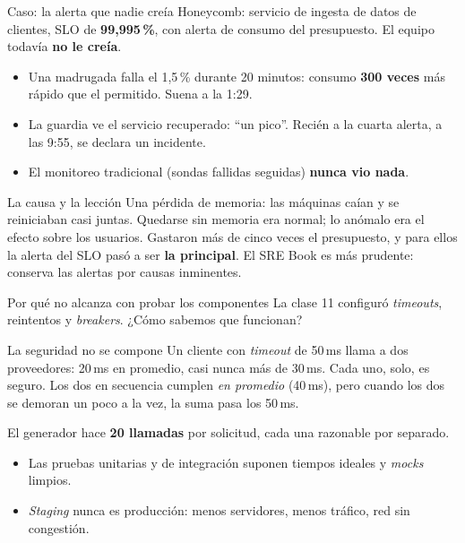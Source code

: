\documentclass[institutional,screen,none]{ua-engineering-v6-beamer}
\begin{document}
\begin{frame}{Caso: la alerta que nadie creía}
Honeycomb: servicio de ingesta de datos de clientes, SLO de \textbf{99,995\,\%}, con alerta de consumo del presupuesto. El equipo todavía \textbf{no le creía}.

\pause

\begin{itemize}\small
\item Una madrugada falla el 1,5\,\% durante 20 minutos: consumo \textbf{300 veces} más rápido que el permitido. Suena a la 1:29.
\item La guardia ve el servicio recuperado: ``un pico''. Recién a la cuarta alerta, a las 9:55, se declara un incidente.
\item El monitoreo tradicional (sondas fallidas seguidas) \textbf{nunca vio nada}.
\end{itemize}

\pause

\begin{block}{La causa y la lección}
Una pérdida de memoria: las máquinas caían y se reiniciaban casi juntas. Quedarse sin memoria era normal; lo anómalo era el efecto sobre los usuarios. Gastaron más de cinco veces el presupuesto, y para ellos la alerta del SLO pasó a ser \textbf{la principal}. El SRE Book es más prudente: conserva las alertas por causas inminentes.
\end{block}
\end{frame}


\begin{frame}{Por qué no alcanza con probar los componentes}
La clase 11 configuró \emph{timeouts}, reintentos y \emph{breakers}. ¿Cómo sabemos que funcionan?

\pause

\begin{block}{La seguridad no se compone}
Un cliente con \emph{timeout} de 50\,ms llama a dos proveedores: 20\,ms en promedio, casi nunca más de 30\,ms. Cada uno, solo, es seguro. Los dos en secuencia cumplen \emph{en promedio} (40\,ms), pero cuando los dos se demoran un poco a la vez, la suma pasa los 50\,ms.
\end{block}

{\small El generador hace \textbf{20 llamadas} por solicitud, cada una razonable por separado.}

\pause

\begin{itemize}\small
\item Las pruebas unitarias y de integración suponen tiempos ideales y \emph{mocks} limpios.
\item \emph{Staging} nunca es producción: menos servidores, menos tráfico, red sin congestión.
\end{itemize}
\end{frame}
\end{document}
